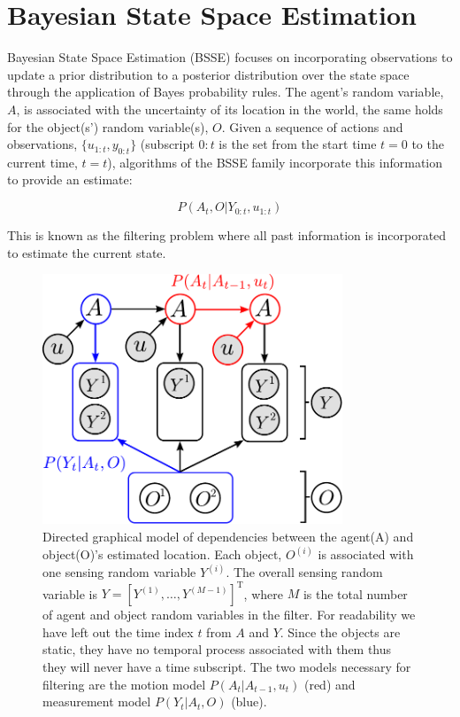 \section{Bayesian State Space Estimation}\label{ch5:BSSE}

Bayesian State Space Estimation (BSSE) focuses on incorporating observations to update a prior distribution to a posterior distribution 
over the state space through the application of Bayes probability rules. The agent's random variable, $A$, 
is associated with the uncertainty of its location in the world, the same holds for the object(s') random variable(s), $O$. 
Given a sequence of actions and observations, $\{u_{1:t},y_{0:t}\}$ (subscript $0:t$ is the set from the start time $t=0$ to the current time, $t=t$), 
algorithms of the BSSE family incorporate this information to provide an estimate:

\begin{equation}
 P(A_t,O|Y_{0:t},u_{1:t}) 
 \label{eq:joint}
\end{equation}

This is known as the filtering problem where all past information is incorporated to estimate the current state.  

\begin{figure}
\centering
\includegraphics[width=0.8\textwidth]{./ch5-MLMF/Figures/Figure2.pdf}
\caption{Directed graphical model of dependencies between the agent(A) and object(O)'s estimated location. Each 
object, $O^{(i)}$ is associated with one sensing random variable $Y^{(i)}$. The overall sensing random variable is $Y = \left[Y^{(1)},\dots,Y^{(M-1)}\right]^{\mathrm{T}}$,
where $M$ is the total number of agent and object random variables in the filter. 
For readability we have left out the time index $t$ from $A$ and $Y$. Since the objects are static, they have no temporal process associated with 
them thus they will never have a time subscript. The two models necessary for filtering are the motion model $P(A_t|A_{t-1},u_t)$ (red) and measurement model
$P(Y_t|A_t,O)$ (blue).}
\label{fig:bayesian_sse_dag}
\end{figure}

